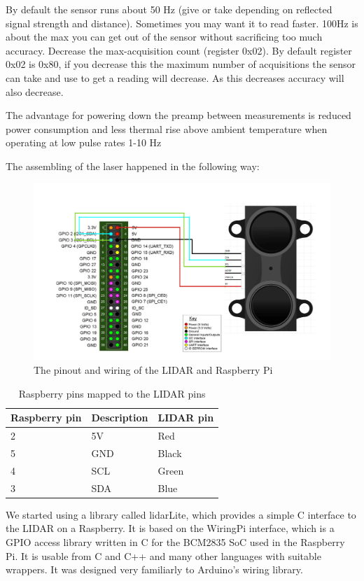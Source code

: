 By default the sensor runs about 50 Hz (give or take depending on reflected signal strength and distance). Sometimes you may want it to read faster. 100Hz is about the max you can get out of the sensor without sacrificing too much accuracy.
Decrease the max-acquisition count (register 0x02). By default register 0x02 is 0x80, if you decrease this the maximum number of acquisitions the sensor can take and use to get a reading will decrease. As this decreases accuracy will also decrease.

The advantage for powering down the preamp between measurements is reduced power consumption and less thermal rise above ambient temperature when operating at low pulse rates 1-10 Hz

The assembling of the laser happened in the following way:

\begin{figure}[H]
	\centering
	\includegraphics[scale=.4]{images/laderraspberryconnection.png}
	\caption{The pinout and wiring of the LIDAR and Raspberry Pi}
	\label{fig:wiringlidarpi}
\end{figure}

\begin{table}[H]
	\centering
	\begin{tabular}{|l|l|l|}
		\hline
		\textbf{Raspberry pin} & \textbf{Description} & \textbf{LIDAR pin} \\ \hline
		2 & 5V & Red \\ \hline
		5 & GND & Black \\ \hline
		4 & SCL & Green \\ \hline
		3 & SDA & Blue \\ \hline
	\end{tabular}
	\caption{Raspberry pins mapped to the LIDAR pins}
\end{table}
We started using a library called lidarLite, which provides a simple C interface to the LIDAR on a Raspberry. It is based on the WiringPi interface, which is a GPIO access library written in C for the BCM2835 SoC used in the Raspberry Pi. It is usable from C and C++ and many other languages with suitable wrappers. It was designed very familiarly to Arduino's wiring library.

